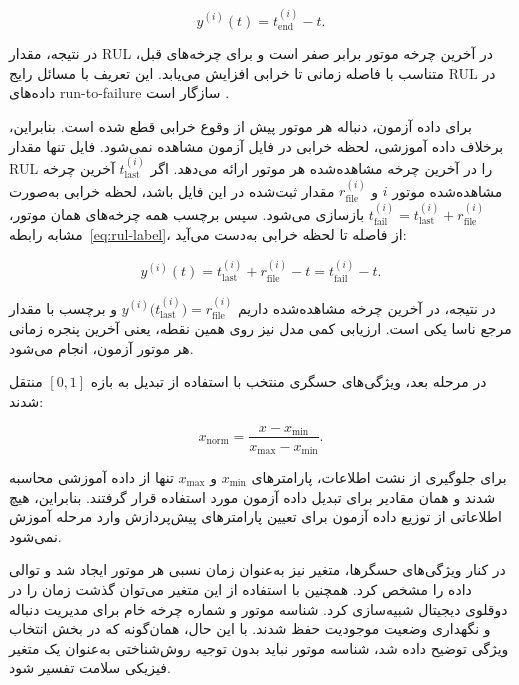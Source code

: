 \documentclass[a4paper,fleqn]{report}
\begin{document}
\begin{equation}
	\label{eq:rul-label}
	y^{(i)}(t)
	=
	t_{\mathrm{end}}^{(i)}-t.
\end{equation}

در نتیجه، مقدار \gls{RUL} در آخرین چرخه موتور برابر صفر است و
برای چرخه‌های قبل، متناسب با فاصله زمانی تا خرابی افزایش می‌یابد.
این تعریف با مسائل رایج 
\gls{RUL}
در داده‌های
\gls{run-to-failure}
 سازگار است \cite{NASA2007C-MAPSS,heimes2008recurrent}.


برای داده آزمون، دنباله هر موتور پیش از وقوع خرابی قطع شده است.
بنابراین، برخلاف داده آموزشی، لحظه خرابی در فایل آزمون مشاهده نمی‌شود.
فایل  تنها مقدار \gls{RUL} را در آخرین چرخه
مشاهده‌شده هر موتور ارائه می‌دهد.
اگر $t_{\mathrm{last}}^{(i)}$ آخرین چرخه مشاهده‌شده موتور $i$
و $r_{\mathrm{file}}^{(i)}$ مقدار ثبت‌شده در این فایل باشد،
لحظه خرابی به‌صورت
$t_{\mathrm{fail}}^{(i)}=t_{\mathrm{last}}^{(i)}+r_{\mathrm{file}}^{(i)}$
بازسازی می‌شود.
سپس برچسب همه چرخه‌های همان موتور، مشابه رابطه~\eqref{eq:rul-label}،
از فاصله تا لحظه خرابی به‌دست می‌آید:

\begin{equation}
	\label{eq:rul-test}
	y^{(i)}(t)
	=
	t_{\mathrm{last}}^{(i)}
	+
	r_{\mathrm{file}}^{(i)}
	-
	t
	=
	t_{\mathrm{fail}}^{(i)}-t.
\end{equation}

در نتیجه، در آخرین چرخه مشاهده‌شده داریم
$y^{(i)}\bigl(t_{\mathrm{last}}^{(i)}\bigr)=r_{\mathrm{file}}^{(i)}$
و برچسب با مقدار مرجع ناسا یکی است.
ارزیابی کمی مدل نیز روی همین نقطه، یعنی آخرین پنجره زمانی هر موتور
آزمون، انجام می‌شود.

در مرحله بعد، ویژگی‌های حسگری منتخب با استفاده از تبدیل
 به بازه $[0,1]$ منتقل شدند:

\begin{equation}
	\label{eq:normalization}
	x_{\mathrm{norm}}
	=
	\frac{x-x_{\min}}
	{x_{\max}-x_{\min}}.
\end{equation}

برای جلوگیری از نشت اطلاعات، پارامترهای $x_{\min}$ و $x_{\max}$
تنها از داده آموزشی محاسبه شدند و همان مقادیر برای تبدیل داده
آزمون مورد استفاده قرار گرفتند. بنابراین، هیچ اطلاعاتی از توزیع
داده آزمون برای تعیین پارامترهای پیش‌پردازش وارد مرحله آموزش
نمی‌شود.


در کنار ویژگی‌های حسگرها، متغیر  نیز به‌عنوان
زمان نسبی هر موتور ایجاد شد و توالی داده را مشخص کرد. همچنین با استفاده از این متغیر می‌توان گذشت زمان را در دوقلوی دیجیتال شبیه‌سازی کرد. شناسه موتور و شماره چرخه خام برای مدیریت دنباله و نگهداری وضعیت موجودیت حفظ شدند. با این حال، همان‌گونه که در بخش انتخاب ویژگی توضیح داده شد،
شناسه موتور نباید بدون توجیه روش‌شناختی به‌عنوان یک متغیر فیزیکی
سلامت تفسیر شود.
\end{document}
